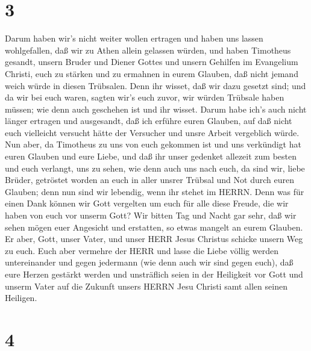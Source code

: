 \hypertarget{section-2}{%
\section{3}\label{section-2}}

 Darum haben wir's nicht weiter wollen ertragen und haben
uns lassen wohlgefallen, daß wir zu Athen allein gelassen würden,
 und haben Timotheus gesandt, unsern Bruder und Diener
Gottes und unsern Gehilfen im Evangelium Christi, euch zu stärken und zu
ermahnen in eurem Glauben,  daß nicht jemand weich würde in
diesen Trübsalen. Denn ihr wisset, daß wir dazu gesetzt sind;
 und da wir bei euch waren, sagten wir's euch zuvor, wir
würden Trübsale haben müssen; wie denn auch geschehen ist und ihr
wisset.  Darum habe ich's auch nicht länger ertragen und
ausgesandt, daß ich erführe euren Glauben, auf daß nicht euch vielleicht
versucht hätte der Versucher und unsre Arbeit vergeblich würde.
 Nun aber, da Timotheus zu uns von euch gekommen ist und uns
verkündigt hat euren Glauben und eure Liebe, und daß ihr unser gedenket
allezeit zum besten und euch verlangt, uns zu sehen, wie denn auch uns
nach euch,  da sind wir, liebe Brüder, getröstet worden an
euch in aller unsrer Trübsal und Not durch euren Glauben; 
denn nun sind wir lebendig, wenn ihr stehet im HERRN.  Denn
was für einen Dank können wir Gott vergelten um euch für alle diese
Freude, die wir haben von euch vor unserm Gott?  Wir bitten
Tag und Nacht gar sehr, daß wir sehen mögen euer Angesicht und
erstatten, so etwas mangelt an eurem Glauben.  Er aber,
Gott, unser Vater, und unser HERR Jesus Christus schicke unsern Weg zu
euch.  Euch aber vermehre der HERR und lasse die Liebe
völlig werden untereinander und gegen jedermann (wie denn auch wir sind
gegen euch),  daß eure Herzen gestärkt werden und
unsträflich seien in der Heiligkeit vor Gott und unserm Vater auf die
Zukunft unsers HERRN Jesu Christi samt allen seinen Heiligen.

\hypertarget{section-3}{%
\section{4}\label{section-3}}

